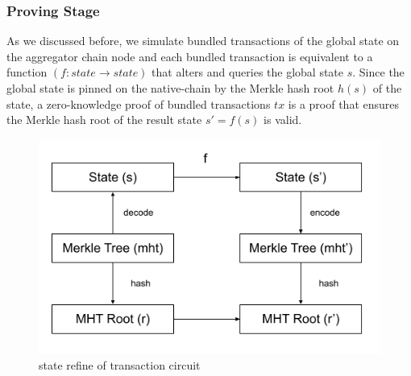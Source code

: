 \documentclass[pageno]{jpaper}
\begin{document}
\subsubsection{Proving Stage}
As we discussed before, we simulate bundled transactions of the global state on the aggregator chain node and each bundled transaction is equivalent to a function $(f: state \rightarrow state)$ that alters and queries the global state $s$. Since the global state is pinned on the native-chain by the Merkle hash root $h(s)$ of the state, a zero-knowledge proof of bundled transactions $tx$ is a proof that ensures the Merkle hash root of the result state $s' = f(s)$ is valid. 
\begin{figure}[!ht]
\begin{center}
\includegraphics[scale=0.8]{circuit-state-refine}
\end{center}
\caption{state refine of transaction circuit}
\label{circuit-refine}
\end{figure}
\end{document}
